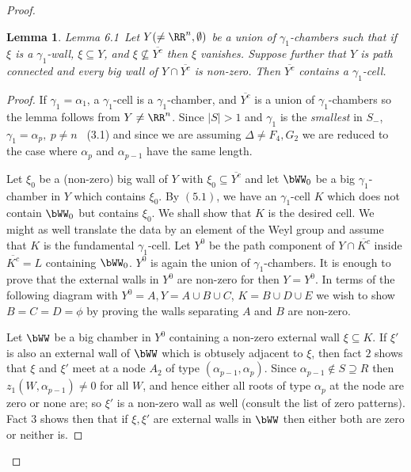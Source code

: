 \documentclass{memo-l}
\newtheorem{lemma}[theorem]{Lemma}
\theoremstyle{definition}
\theoremstyle{remark}
\numberwithin{section}{chapter}
\numberwithin{equation}{chapter}
\begin{document}
\begin{proof}
\medpagebreak

\begin{lemma}{Lemma 6.1}\ Let $Y(\ne {\RR}^{n},{\emptyset})$ be a union of
${\gamma}_{1}$-chambers such that if ${\xi}$ is a ${\gamma}_{1}$-wall,
${\xi} {\subseteq} Y$, and ${\xi} {\not\subseteq} \overline {Y^{c}}$ then ${\xi}$
vanishes.  Suppose further that $Y$ is path connected and every big wall of
$Y \cap \overline {Y^{c}}$ is non-zero.  Then $\overline {Y^{c}}$ contains a
${\gamma}_{1}$-cell.
\end{lemma}

\medpagebreak

\begin{proof}  If ${\gamma}_{1} = {\alpha}_{1}$, a ${\gamma}_{1}$-cell
is a ${\gamma}_{1}$-chamber, and $\overline {Y^{c}}$ is a union of
${\gamma}_{1}$-chambers so the lemma follows from $Y \ne {\RR}^{n}$.
Since $\vert S\vert >1$ and $\gamma_1$ is the {\it smallest\/} in $S_-$,\  
${\gamma}_{1} = {\alpha}_{p},\  p \ne n$ \ (3.1) and since
we are assuming ${\Delta} \ne F_{4}, G_{2}$ we are reduced to the case where
${\alpha}_{p}$ and ${\alpha}_{p-1}$ have the same length.

   Let ${\xi}_{0}$ be a (non-zero) big wall of $Y$ with
${\xi}_{0}{\subseteq} \overline {Y^{c}}$ and let $\bWW_{0}$ 
be a big
${\gamma}_{1}$-chamber in $Y$ which contains ${\xi}_{0}$.  By $(5.1)$, we
have an ${\gamma}_{1}$-cell $K$ which does not contain 
$\bWW_{0}$ but	contains ${\xi}_{0}$.  We shall show 
that $K$ is the desired cell.  We
might as well translate the data by an element of the Weyl group and assume
that $K$ is the fundamental ${\gamma}_{1}$-cell.  Let $Y^{0}$ be the path
component of $Y  \cap  \overline {K^{c}}$ inside $\overline {K^{c}} = L$ 
containing  $\bWW_{0}$.  $Y^{0}$ is again the union of 
${\gamma}_{1}$-chambers.  It
is enough to prove that the external walls in $Y^{0}$ are non-zero for then
$Y = Y^{0}$.  In terms of the following diagram with $Y^{0} = A, Y = 
A \cup B \cup C$, $K = B \cup D \cup E$ we wish to show $B = C = D = 
{\phi}$ by proving the walls separating $A$ and $B$ are non-zero.

\medskip
\medskip

   Let $\bWW$ be a big chamber in $Y^{0}$ containing a non-zero external
wall ${\xi} {\subseteq} K$.  If ${\xi}'$ is also an external wall of 
$\bWW$ which is obtusely adjacent to ${\xi}$, then 
fact $2$ shows that ${\xi}$
and ${\xi}'$ meet at a node $A_{2}$ of type
$({\alpha}_{p-1},{\alpha}_{p})$.  Since $\alpha_{p-1}\not\in S\supseteq R$ then
$z_1(W,{\alpha}_{p-1})\ne 0$ for all
$W$, and hence either all roots of type ${\alpha}_{p}$ at the node are zero or none
are; so ${\xi}'$ is a non-zero wall as well (consult the list of zero
patterns).  Fact $3$ shows then that if ${\xi}, {\xi}'$ are external walls
in $\bWW$ then either both are zero or neither is.


\end{proof}
\end{proof}
\end{document}
